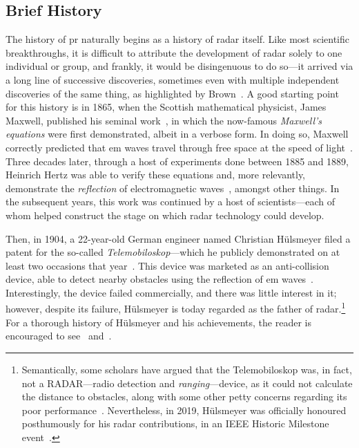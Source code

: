 \documentclass[class=report,11pt,crop=false]{standalone}
\begin{document}
\subsection{Brief History}
The history of \gls{pr} naturally begins as a history of radar itself. Like most scientific breakthroughs, it is difficult to attribute the development of radar solely to one individual or group, and frankly, it would be disingenuous to do so---it arrived via a long line of successive discoveries, sometimes even with multiple independent discoveries of the same thing, as highlighted by Brown~\cite{brown1999technical}. A good starting point for this history is in 1865, when the Scottish mathematical physicist, James Maxwell, published his seminal work~\cite{maxwell1865viii}, in which the now-famous \emph{Maxwell's equations} were first demonstrated, albeit in a verbose form. In doing so, Maxwell correctly predicted that \Gls{em} waves travel through free space at the speed of light~\cite{Sengupta2003}. Three decades later, through a host of experiments done between 1885 and 1889, Heinrich Hertz was able to verify these equations and, more relevantly, demonstrate the \emph{reflection} of electromagnetic waves~\cite{hertz1893electromagnetic, Cichon1995}, amongst other things. In the subsequent years, this work was continued by a host of scientists---each of whom helped construct the stage on which radar technology could develop.

Then, in 1904, a 22-year-old German engineer named Christian H\"ulsmeyer filed a patent for the so-called \emph{Telemobiloskop}---which he publicly demonstrated on at least two occasions that year~\cite{Galati2014}. This device was marketed as an anti-collision device, able to detect nearby obstacles using the reflection of \gls{em} waves~\cite{swords1986technical}. Interestingly, the device failed commercially, and there was little interest in it; however, despite its failure, H\"ulsmeyer is today regarded as the father of radar.\footnote{Semantically, some scholars have argued that the Telemobiloskop was, in fact, not a RADAR---radio detection and \emph{ranging}---device, as it could not calculate the distance to obstacles, along with some other petty concerns regarding its poor performance~\cite{pritchard1989radar}. Nevertheless, in 2019, H\"ulsmeyer was officially honoured posthumously for his radar contributions, in an IEEE Historic Milestone event~\cite{Griffiths2019}.} For a thorough history of H\"ulsmeyer and his achievements, the reader is encouraged to see~\cite{pritchard1989radar} and~\cite{bauer2005christian}.
\end{document}
